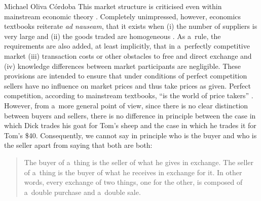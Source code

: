 \begin{artengenv}{Michael Oliva Córdoba}
This market structure is criticised even within mainstream economic theory 
\parencites[cf., e.g.,][]{ackerman_flawed_2004}[][]{petri_general_2003}. %
 Completely unimpressed, however, economics textbooks reiterate \textit{ad nauseam}, that it exists when (i) the number of suppliers is very large and (ii) the goods traded are homogeneous 
\parencite[see, e.g.,][p.62]{mankiw_principles_2020}. %
 As a~rule, the requirements are also added, at least implicitly, that in a~perfectly competitive market (iii) transaction costs or other obstacles to free and direct exchange and (iv) knowledge differences between market participants are negligible. These provisions are intended to ensure that under conditions of perfect competition sellers have no influence on market prices and thus take prices as given. Perfect competition, according to mainstream textbooks, ``is the world of price takers'' 
\parencite[][p.150]{samuelson_economics_2009}. %
 However, from a~more general point of view, since there is no clear distinction between buyers and sellers, there is no difference in principle between the case in which Dick trades his goat for Tom's sheep and the case in which he trades it for Tom's \$40. Consequently, we cannot say in principle who is the buyer and who is the seller apart from saying that both are both:



\begin{quote}
The buyer of a~thing is the seller of what he gives in exchange. The seller of a~thing is the buyer of what he receives in exchange for it. In other words, every exchange of two things, one for the other, is composed of a~double purchase and a~double sale. 
\parencite[][p.42\ \mbox{[orig.~1896]}]{walras_lewalras_2019}%
\end{quote}





\end{artengenv}
